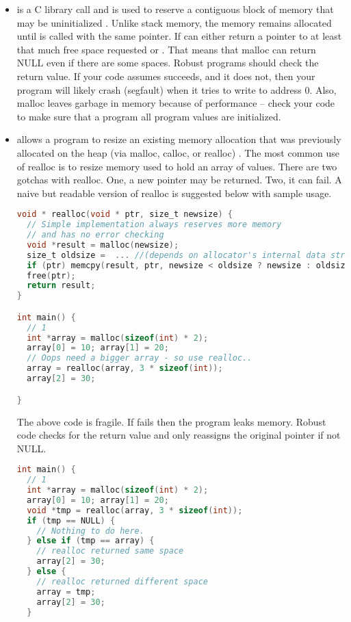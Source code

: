 \begin{itemize}

\item {} is a C library call and is used to reserve a contiguous block of memory that may be uninitialized \cite[P. 348]{jones2010wg14}.
Unlike stack memory, the memory remains allocated until  is called with the same pointer.
If  can either return a pointer to at least that much free space requested or .
That means that malloc can return NULL even if there are some spaces.
Robust programs should check the return value.
If your code assumes  succeeds, and it does not, then your program will likely crash (segfault) when it tries to write to address 0.
Also, malloc leaves garbage in memory because of performance -- check your code to make sure that a program all program values are initialized.

\item {} allows a program to resize an existing memory allocation that was previously allocated on the heap (via malloc, calloc, or realloc) \cite[P. 349]{jones2010wg14}.
The most common use of realloc is to resize memory used to hold an array of values.
There are two gotchas with realloc.
One, a new pointer may be returned.
Two, it can fail.
A naive but readable version of realloc is suggested below with sample usage.

\begin{lstlisting}[language=C]
void * realloc(void * ptr, size_t newsize) {
  // Simple implementation always reserves more memory
  // and has no error checking
  void *result = malloc(newsize);
  size_t oldsize =  ... //(depends on allocator's internal data structure)
  if (ptr) memcpy(result, ptr, newsize < oldsize ? newsize : oldsize);
  free(ptr);
  return result;
}

int main() {
  // 1
  int *array = malloc(sizeof(int) * 2);
  array[0] = 10; array[1] = 20;
  // Oops need a bigger array - so use realloc..
  array = realloc(array, 3 * sizeof(int));
  array[2] = 30;

}
\end{lstlisting}

The above code is fragile.
If  fails then the program leaks memory.
Robust code checks for the return value and only reassigns the original pointer if not NULL.

\begin{lstlisting}[language=C]
int main() {
  // 1
  int *array = malloc(sizeof(int) * 2);
  array[0] = 10; array[1] = 20;
  void *tmp = realloc(array, 3 * sizeof(int));
  if (tmp == NULL) {
    // Nothing to do here.
  } else if (tmp == array) {
    // realloc returned same space
    array[2] = 30;
  } else {
    // realloc returned different space
    array = tmp;
    array[2] = 30;
  }


\end{lstlisting}
\end{itemize}
